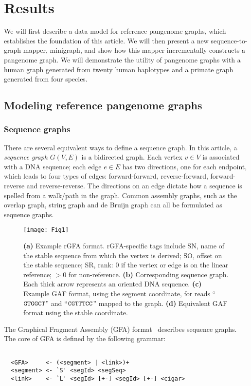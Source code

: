 \documentclass[twocolumn]{bmcart}%
\begin{document}
\section*{Results}

We will first describe a data model for reference pangenome graphs, which
establishes the foundation of this article. We will then present a new
sequence-to-graph mapper, minigraph, and show how this mapper incrementally
constructs a pangenome graph. We will demonstrate the utility of pangenome
graphs with a human graph generated from twenty human haplotypes and a primate
graph generated from four species.

\subsection*{Modeling reference pangenome graphs}

\subsubsection*{Sequence graphs}

There are several equivalent ways to define a sequence graph. In this article,
a \emph{sequence graph} $G(V,E)$ is a bidirected graph. Each vertex $v\in V$ is
associated with a DNA sequence; each edge $e\in E$ has two directions, one for
each endpoint, which leads to four types of edges: forward-forward,
reverse-forward, forward-reverse and reverse-reverse. The directions on an edge
dictate how a sequence is spelled from a walk/path in the graph. Common
assembly graphs, such as the overlap graph, string graph and de Bruijn graph
can all be formulated as sequence graphs.

\begin{figure}[t]
\texttt{[image: Fig1]}
\caption{ {\bf (a)} Example rGFA
  format. rGFA-specific tags include SN, name of the stable sequence from which
  the vertex is derived; SO, offset on the stable sequence; SR, rank: 0 if the
  vertex or edge is on the linear reference; $>$0 for non-reference.  {\bf (b)}
  Corresponding sequence graph. Each thick arrow represents an oriented DNA
  sequence. {\bf (c)} Example GAF format, using the segment coordinate, for
  reads ``${\tt GTGGCT}$'' and ``${\tt CGTTTCC}$'' mapped to the graph. {\bf
  (d)} Equivalent GAF format using the stable coordinate.}\label{fig:rgfa}
\end{figure}

The Graphical Fragment Assembly (GFA) format~\cite{Li:2016aa} describes
sequence graphs. The core of GFA is defined by the following grammar:
{\footnotesize
\begin{verbatim}

  <GFA>     <- (<segment> | <link>)+
  <segment> <- `S' <segId> <segSeq>
  <link>    <- `L' <segId> [+-] <segId> [+-] <cigar>

\end{verbatim}}
\end{document}
